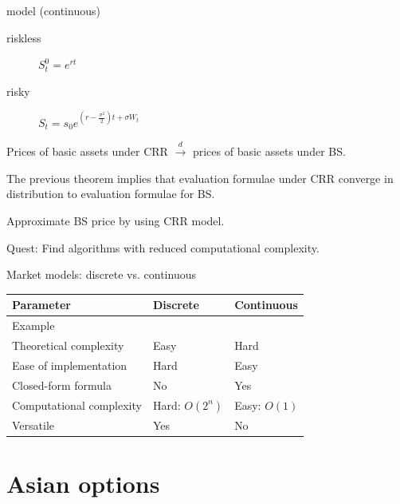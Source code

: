\documentclass[utf8,t,xcolor=svgnames]{beamer}
\begin{document}
\begin{frame}{\cite{Black1973} model (continuous)}
	\begin{description}
		\item[riskless] $ S_t^0 = e^{rt} $
		\item[risky] $ S_t  =  s_0 e^{ ( r - \frac{\sigma^2}{2} ) t + \sigma W_t } $
	\end{description}
	
	\begin{theorem}
		Prices of basic assets under CRR $ \xrightarrow{d} $ prices of basic assets under BS.
	\end{theorem}
	
	\begin{corollary}
		The previous theorem implies that evaluation formulae under CRR converge in distribution to evaluation formulae for BS.
	\end{corollary}
	
	\bigskip
	
	Approximate BS price by using CRR model.
	
	\bigskip
	
	\alert{Quest}: Find algorithms with reduced computational complexity.
	
\end{frame}


\begin{frame}{Market models: discrete vs. continuous}
	\begin{tabular}{lll}
		\toprule
		Parameter  &  Discrete  &  Continuous  \\
		\midrule
		Example  &  \cite{Cox1979}  &  \cite{Black1973}  \\
		Theoretical complexity  &  Easy  &  Hard  \\
		Ease of implementation  &  Hard  &  Easy  \\
		Closed-form formula  &  No\footnotemark  &  Yes  \\
		Computational complexity  &  Hard: $ O(2^n) $\footnotemark[1]  &  Easy: $ O(1) $  \\
		Versatile  &  Yes  &  No  \\
		\bottomrule
	\end{tabular}
\end{frame}



\section{Asian options}
\end{document}
